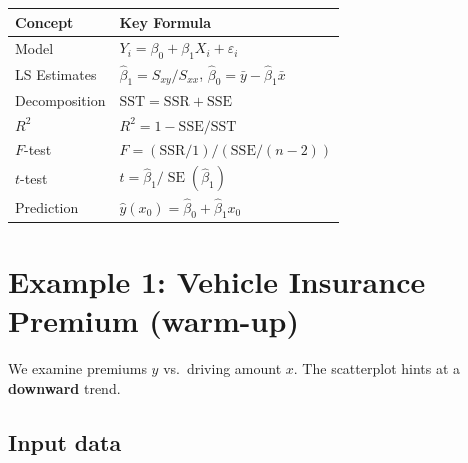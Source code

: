 \documentclass[
  letterpaper,
  DIV=11,
  numbers=noendperiod]{scrreprt}
\begin{document}
\begin{longtable}[]{@{}
  >{\raggedright\arraybackslash}p{}
  >{\raggedright\arraybackslash}p{}@{}}
\toprule\noalign{}
\begin{minipage}[b]{\linewidth}\raggedright
Concept
\end{minipage} & \begin{minipage}[b]{\linewidth}\raggedright
Key Formula
\end{minipage} \\
\midrule\noalign{}
\endhead
\bottomrule\noalign{}
\endlastfoot
Model & \(Y_i = \beta_0 + \beta_1 X_i + \varepsilon_i\) \\
LS Estimates & \(\hat\beta_1 = S_{xy}/S_{xx}\),
\(\hat\beta_0 = \bar y - \hat\beta_1\bar x\) \\
Decomposition & \(\mathrm{SST} = \mathrm{SSR} + \mathrm{SSE}\) \\
\(R^2\) & \(R^2 = 1 - \mathrm{SSE}/\mathrm{SST}\) \\
\(F\)-test & \(F = (\mathrm{SSR}/1)/(\mathrm{SSE}/(n-2))\) \\
\(t\)-test & \(t = \hat\beta_1 / \operatorname{SE}(\hat\beta_1)\) \\
Prediction & \(\hat y(x_0) = \hat\beta_0 + \hat\beta_1 x_0\) \\
\end{longtable}

\section{Example 1: Vehicle Insurance Premium
(warm-up)}\label{example-1-vehicle-insurance-premium-warm-up}

We examine premiums \(y\) vs.~driving amount \(x\). The scatterplot
hints at a \textbf{downward} trend.

\subsection{Input data}\label{input-data}
\end{document}
